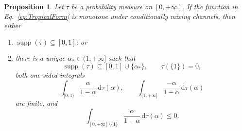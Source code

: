 \documentclass[aps,pra,11pt,onecolumn,nofootinbib,tightenlines]{revtex4-2}
\newtheorem{proposition}[theorem]{Proposition}
\theoremstyle{definition}
\def \d {\mathrm{d}}
\begin{document}
\begin{proposition}
\label{prop:negative-tropical-necessary}
Let $\tau$ be a probability measure on $[0,+\infty]$.  If the function in
Eq.~\eqref{eq:TropicalForm} is monotone under conditionally mixing channels,
then either
\begin{enumerate}[label=(\alph*)]
\item $\operatorname{supp}(\tau)\subseteq[0,1]$; or
\item there is a unique $\alpha_*\in(1,+\infty]$ such that
\[
\operatorname{supp}(\tau)\subseteq[0,1]\cup\{\alpha_*\},
\qquad \tau(\{1\})=0,
\]
both one-sided integrals
\[
\int_{[0,1)}\frac{\alpha}{1-\alpha}\,\d\tau(\alpha),
\qquad
\int_{(1,+\infty]}\frac{-\alpha}{1-\alpha}\,\d\tau(\alpha)
\]
are finite, and
\begin{equation}
\label{eq:negative-tropical-necessary-moment}
\int_{[0,+\infty]\setminus\{1\}}
\frac{\alpha}{1-\alpha}\,\d\tau(\alpha)\leq0.
\end{equation}
\end{enumerate}
\end{proposition}
\end{document}
